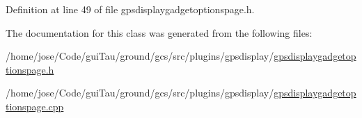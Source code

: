 Definition at line 49 of file gpsdisplaygadgetoptionspage.\-h.



The documentation for this class was generated from the following files\-:\begin{DoxyCompactItemize}
\item 
/home/jose/\-Code/gui\-Tau/ground/gcs/src/plugins/gpsdisplay/\hyperlink{gpsdisplaygadgetoptionspage_8h}{gpsdisplaygadgetoptionspage.\-h}\item 
/home/jose/\-Code/gui\-Tau/ground/gcs/src/plugins/gpsdisplay/\hyperlink{gpsdisplaygadgetoptionspage_8cpp}{gpsdisplaygadgetoptionspage.\-cpp}\end{DoxyCompactItemize}
